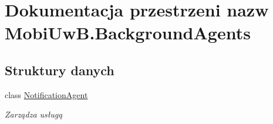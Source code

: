 \hypertarget{a00265}{}\section{Dokumentacja przestrzeni nazw Mobi\+Uw\+B.\+Background\+Agents}
\label{a00265}
\subsection*{Struktury danych}
\begin{DoxyCompactItemize}
\item 
class \hyperlink{a00041}{Notification\+Agent}
\begin{DoxyCompactList}\small\item\em Zarządza usługą \end{DoxyCompactList}\end{DoxyCompactItemize}
